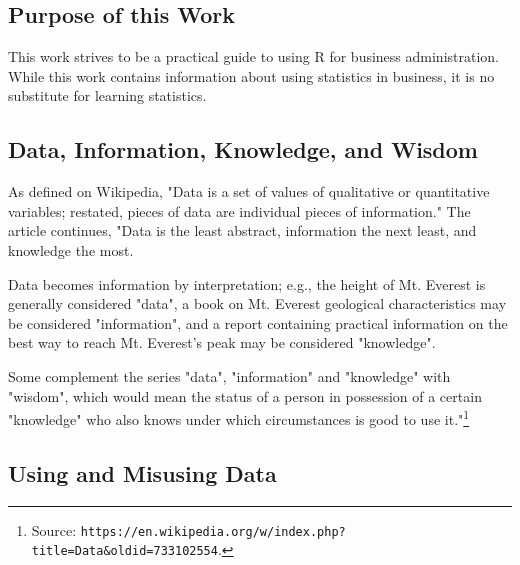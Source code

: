 %
%
%
%
%

\subsection{Purpose of this Work}
This work strives to be a practical guide to using R for business 
administration. While this work contains information about using statistics in business, it is no substitute for learning statistics.

\subsection{Data, Information, Knowledge, and Wisdom}
As defined on Wikipedia, "Data is a set of values of qualitative or quantitative variables; restated, pieces of data are individual pieces of information." The article continues, "Data is the least abstract, information the next least, and knowledge the most.

Data becomes information by interpretation; e.g., the height of Mt. Everest is generally considered "data", a book on Mt. Everest geological characteristics may be considered "information", and a report containing practical information on the best way to reach Mt. Everest's peak may be considered "knowledge".

Some complement the series "data", "information" and "knowledge" with "wisdom", which would mean the status of a person in possession of a certain "knowledge" who also knows under which circumstances is good to use it."\footnote{Source: \texttt{https://en.wikipedia.org/w/index.php?title=Data&oldid=733102554}.}

\subsection{Using and Misusing Data}
